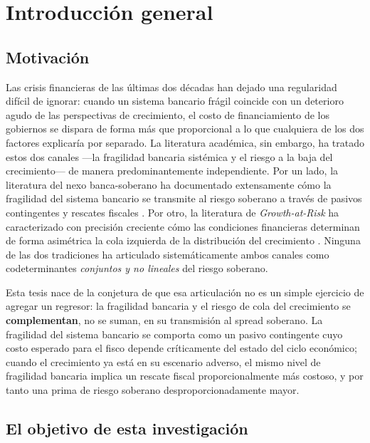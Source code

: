 \chapter{Introducción general}
\label{chap:intro}

\section{Motivación}

Las crisis financieras de las últimas dos décadas han dejado una regularidad difícil de ignorar: cuando un sistema bancario frágil coincide con un deterioro agudo de las perspectivas de crecimiento, el costo de financiamiento de los gobiernos se dispara de forma más que proporcional a lo que cualquiera de los dos factores explicaría por separado. La literatura académica, sin embargo, ha tratado estos dos canales —la fragilidad bancaria sistémica y el riesgo a la baja del crecimiento— de manera predominantemente independiente. Por un lado, la literatura del nexo banca-soberano ha documentado extensamente cómo la fragilidad del sistema bancario se transmite al riesgo soberano a través de pasivos contingentes y rescates fiscales \citep{FarhiTirole2018b,AcharyaDrechslerSchnabl2014b}. Por otro, la literatura de \textit{Growth-at-Risk} ha caracterizado con precisión creciente cómo las condiciones financieras determinan de forma asimétrica la cola izquierda de la distribución del crecimiento \citep{ABG2019b}. Ninguna de las dos tradiciones ha articulado sistemáticamente ambos canales como codeterminantes \textit{conjuntos y no lineales} del riesgo soberano.

Esta tesis nace de la conjetura de que esa articulación no es un simple ejercicio de agregar un regresor: la fragilidad bancaria y el riesgo de cola del crecimiento se \textbf{complementan}, no se suman, en su transmisión al spread soberano. La fragilidad del sistema bancario se comporta como un pasivo contingente cuyo costo esperado para el fisco depende críticamente del estado del ciclo económico; cuando el crecimiento ya está en su escenario adverso, el mismo nivel de fragilidad bancaria implica un rescate fiscal proporcionalmente más costoso, y por tanto una prima de riesgo soberano desproporcionadamente mayor.

\section{El objetivo de esta investigación}

